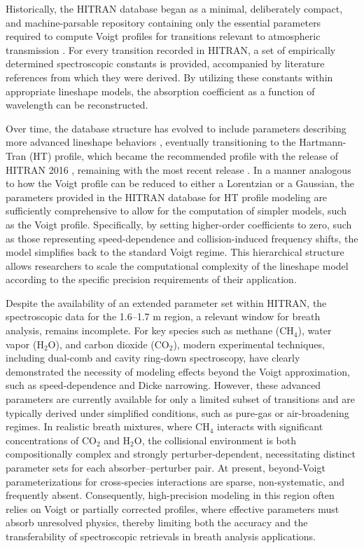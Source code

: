 \documentclass[8pt,a4paper]{report}
\begin{document}
	Historically, the HITRAN database began as a minimal, deliberately compact, and machine-parsable repository containing only the essential parameters required to compute Voigt profiles for transitions relevant to atmospheric transmission \cite{hitran_original_1973}. For every transition recorded in HITRAN, a set of empirically determined spectroscopic constants is provided, accompanied by literature references from which they were derived. By utilizing these constants within appropriate lineshape models, the absorption coefficient as a function of wavelength can be reconstructed.
	
	Over time, the database structure has evolved to include parameters describing more advanced lineshape behaviors \cite{hitran_1986}, eventually transitioning to the Hartmann-Tran (HT) profile, which became the recommended profile with the release of HITRAN 2016 \cite{hitran_2016}, remaining with the most recent release \cite{hitran_2024}. In a manner analogous to how the Voigt profile can be reduced to either a Lorentzian or a Gaussian, the parameters provided in the HITRAN database for HT profile modeling are sufficiently comprehensive to allow for the computation of simpler models, such as the Voigt profile. Specifically, by setting higher-order coefficients to zero, such as those representing speed-dependence and collision-induced frequency shifts, the model simplifies back to the standard Voigt regime. This hierarchical structure allows researchers to scale the computational complexity of the lineshape model according to the specific precision requirements of their application.
	
	Despite the availability of an extended parameter set within HITRAN, the spectroscopic data for the 1.6–1.7 {\textmu}m region, a relevant window for breath analysis, remains incomplete. For key species such as methane ($\text{CH}_4$), water vapor ($\text{H}_2\text{O}$), and carbon dioxide ($\text{CO}_2$), modern experimental techniques, including dual-comb and cavity ring-down spectroscopy, have clearly demonstrated the necessity of modeling effects beyond the Voigt approximation, such as speed-dependence and Dicke narrowing. However, these advanced parameters are currently available for only a limited subset of transitions and are typically derived under simplified conditions, such as pure-gas or air-broadening regimes. In realistic breath mixtures, where $\text{CH}_4$ interacts with significant concentrations of $\text{CO}_2$ and $\text{H}_2\text{O}$, the collisional environment is both compositionally complex and strongly perturber-dependent, necessitating distinct parameter sets for each absorber–perturber pair. At present, beyond-Voigt parameterizations for cross-species interactions are sparse, non-systematic, and frequently absent. Consequently, high-precision modeling in this region often relies on Voigt or partially corrected profiles, where effective parameters must absorb unresolved physics, thereby limiting both the accuracy and the transferability of spectroscopic retrievals in breath analysis applications.
	
\end{document}
